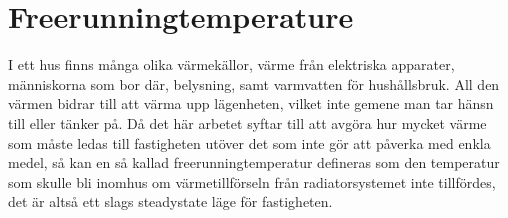 \section*{Freerunningtemperature}
I ett hus finns många olika värmekällor, värme från elektriska apparater, människorna som bor där, belysning, samt varmvatten för hushållsbruk. All den värmen bidrar till att värma upp lägenheten, vilket inte gemene man tar hänsn till eller tänker på. Då det här arbetet syftar till att avgöra hur mycket värme som måste ledas till fastigheten utöver det som inte gör att påverka med enkla medel, så kan en så kallad freerunningtemperatur defineras som den temperatur som skulle bli inomhus om värmetillförseln från radiatorsystemet inte tillfördes, det är altså ett slags steadystate läge för fastigheten.

\newpage
